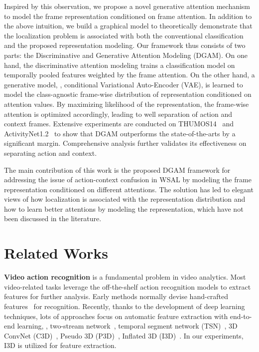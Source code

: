 \documentclass[10pt,twocolumn,letterpaper]{article}
\begin{document}
Inspired by this observation, we propose a novel generative attention mechanism to model the frame representation conditioned on frame attention. In addition to the above intuition, we build a graphical model to theoretically demonstrate that the localization problem is associated with both the conventional classification and the proposed representation modeling.
Our framework thus consists of two parts: the Discriminative and Generative Attention Modeling (DGAM).
On one hand, the discriminative attention modeling trains a classification model on temporally pooled features weighted by the frame attention.
On the other hand, a generative model, \ie, conditional Variational Auto-Encoder (VAE), is learned to model the class-agnostic frame-wise distribution of representation conditioned on attention values.
By maximizing likelihood of the representation, the frame-wise attention is optimized accordingly, leading to well separation of action and context frames.
Extensive experiments are conducted on THUMOS14~\cite{idrees2017thumos} and ActivityNet1.2~\cite{caba2015activitynet} to show that DGAM outperforms the state-of-the-arts by a significant margin.
Comprehensive analysis further validates its effectiveness on separating action and context.

The main contribution of this work is the proposed DGAM framework for addressing the issue of action-context confusion in WSAL by modeling the frame representation conditioned on different attentions.
The solution has led to elegant views of how localization is associated with the representation distribution
and how to learn better attentions by modeling the representation,
which have not been discussed in the literature.










\section{Related Works}

\textbf{Video action recognition} is a fundamental problem in video analytics.
Most video-related tasks leverage the off-the-shelf action recognition models to extract features for further analysis.
Early methods normally devise hand-crafted features~\cite{laptev2005space,wang2013action,oneata2013action} for recognition.
Recently, thanks to the development of deep learning techniques, lots of approaches focus on automatic feature extraction with end-to-end learning, \eg, two-stream network~\cite{simonyan2014two}, temporal segment network (TSN)~\cite{wang2016temporal}, 3D ConvNet (C3D)~\cite{tran2015learning}, Pseudo 3D (P3D)~\cite{qiu2017learning}, Inflated 3D (I3D)~\cite{carreira2017quo}.
In our experiments, I3D is utilized for feature extraction.
\end{document}
